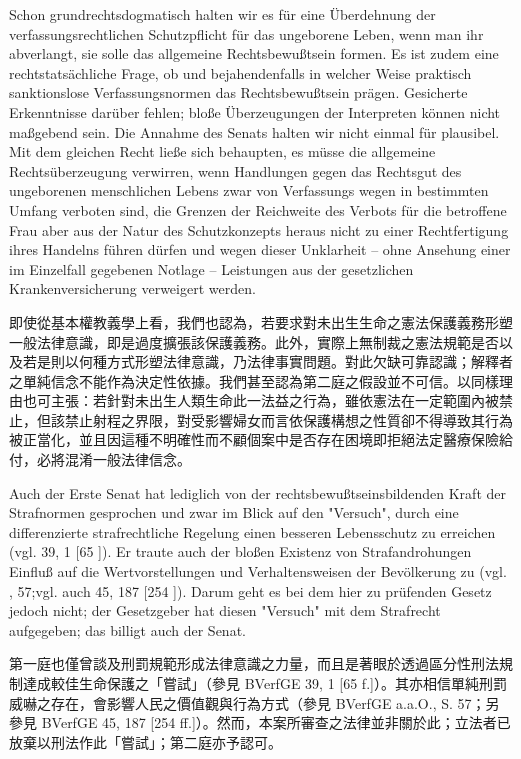 \documentclass[12pt]{article}
\begin{document}
\begin{sourcepara}[title={原文SondervotumMS.304}]
Schon grundrechtsdogmatisch halten wir es für eine Überdehnung der verfassungsrechtlichen Schutzpflicht für das ungeborene Leben, wenn man ihr abverlangt, sie solle das allgemeine Rechtsbewußtsein formen. Es ist zudem eine rechtstatsächliche Frage, ob und bejahendenfalls in welcher Weise praktisch sanktionslose Verfassungsnormen das Rechtsbewußtsein prägen. Gesicherte Erkenntnisse darüber fehlen; bloße Überzeugungen der Interpreten können nicht maßgebend sein. Die Annahme des Senats halten wir nicht einmal für plausibel. Mit dem gleichen Recht ließe sich behaupten, es müsse die allgemeine Rechtsüberzeugung verwirren, wenn Handlungen gegen das Rechtsgut des ungeborenen menschlichen Lebens zwar von Verfassungs wegen in bestimmten Umfang verboten sind, die Grenzen der Reichweite des Verbots für die betroffene Frau aber aus der Natur des Schutzkonzepts heraus nicht zu einer Rechtfertigung ihres Handelns führen dürfen und wegen dieser Unklarheit -- ohne Ansehung einer im Einzelfall gegebenen Notlage -- Leistungen aus der gesetzlichen Krankenversicherung verweigert werden.
\end{sourcepara}
\begin{transpara}
即使從基本權教義學上看，我們也認為，若要求對未出生生命之憲法保護義務形塑一般法律意識，即是過度擴張該保護義務。此外，實際上無制裁之憲法規範是否以及若是則以何種方式形塑法律意識，乃法律事實問題。對此欠缺可靠認識；解釋者之單純信念不能作為決定性依據。我們甚至認為第二庭之假設並不可信。以同樣理由也可主張：若針對未出生人類生命此一法益之行為，雖依憲法在一定範圍內被禁止，但該禁止射程之界限，對受影響婦女而言依保護構想之性質卻不得導致其行為被正當化，並且因這種不明確性而不顧個案中是否存在困境即拒絕法定醫療保險給付，必將混淆一般法律信念。
\end{transpara}

\begin{sourcepara}[title={原文SondervotumMS.305}]
Auch der Erste Senat hat lediglich von der rechtsbewußtseinsbildenden Kraft der Strafnormen gesprochen und zwar im Blick auf den "Versuch", durch eine differenzierte strafrechtliche Regelung einen besseren Lebensschutz zu erreichen (vgl. \abbrBVerfGE{} 39, 1 [65 \abbrF{}]). Er traute auch der bloßen Existenz von Strafandrohungen Einfluß auf die Wertvorstellungen und Verhaltensweisen der Bevölkerung zu (vgl. \abbrBVerfGE{} \abbrAAO{}, \abbrS{} 57;vgl. auch \abbrBVerfGE{} 45, 187 [254 \abbrFF{}]). Darum geht es bei dem hier zu prüfenden Gesetz jedoch nicht; der Gesetzgeber hat diesen "Versuch" mit dem Strafrecht aufgegeben; das billigt auch der Senat.
\end{sourcepara}
\begin{transpara}
第一庭也僅曾談及刑罰規範形成法律意識之力量，而且是著眼於透過區分性刑法規制達成較佳生命保護之「嘗試」（參見 BVerfGE 39, 1 [65 f.]）。其亦相信單純刑罰威嚇之存在，會影響人民之價值觀與行為方式（參見 BVerfGE a.a.O., S. 57；另參見 BVerfGE 45, 187 [254 ff.]）。然而，本案所審查之法律並非關於此；立法者已放棄以刑法作此「嘗試」；第二庭亦予認可。
\end{transpara}
\end{document}
